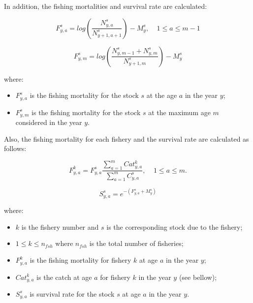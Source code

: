 \documentclass{article}
\begin{document}
\hfill

In addition, the fishing mortalities and survival rate are calculated:

\begin{equation}
F^s_{y,a}=log\left(\dfrac{N^s_{y,a}}{N^s_{y+1,a+1}}\right)-M^s_y, \ \ \ \ \ 1\leq a \leq m-1
\end{equation}

\begin{equation}
F^s_{y,m}=log\left(\dfrac{N^s_{y,m-1}+N^s_{y,m}}{N^s_{y+1,m}}\right)-M^s_y
\end{equation}

where:

\begin{itemize}
    \item $F^s_{y,a}$ is the fishing mortality for the stock $s$ at the age $a$ in the year $y$;

    \item $F^s_{y,m}$ is the fishing mortality for the stock $s$ at the maximum age $m$ considered in the year $y$.
\end{itemize}

\hfill

Also, the fishing mortality for each fishery and the survival rate are calculated as follows:

\begin{equation}
F^k_{y,a}=F^s_{y,a} \dfrac{\sum_{a = 1} ^{m} Cat^k_{y,a}}{\sum_{a=1} ^{m} C^s_{y,a}}, \ \ \ \ \ 1\leq a \leq m.
\end{equation}

\begin{equation}
S^s_{y,a}=e^{-(F^s_{y,a}+M^s_{y})}
\end{equation}

where:
\begin{itemize}
    \item $k$ is the fishery number and $s$ is the corresponding stock due to the fishery;
    
    \item $1\leq k \leq n_{fsh}$ where $n_{fsh}$ is the total number of fisheries;
   
    \item $F^k_{y,a}$ is the fishing mortality for fishery $k$ at age $a$ in the year $y$;

    \item $Cat^k_{y,a}$ is the catch at age $a$ for fishery $k$ in the year $y$ (see bellow);
    
    \item $S^s_{y,a}$ is survival rate for the stock $s$ at age $a$ in the year $y$.
\end{itemize}
\end{document}
